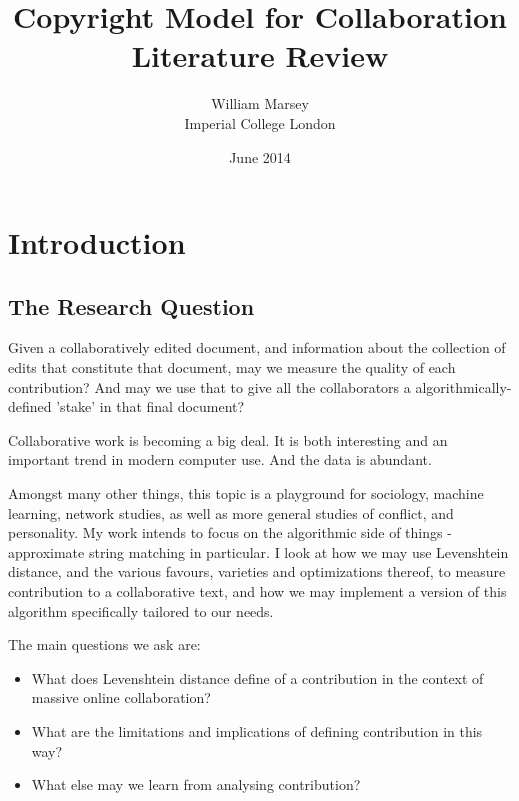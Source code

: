 \documentclass[a4paper,11pt,twoside,notitlepage]{article}
\begin{document}
	\title{Copyright Model for Collaboration
		\\ \small Literature Review}
	\author{William Marsey
		\\Imperial College London}
	\date{June 2014}
 	\maketitle	

        \section{Introduction}
        \subsection{The Research Question}
        Given a collaboratively edited document, and information about
        the collection of edits that constitute that document, may we
        measure the quality of each contribution? And may we use that
        to give all the collaborators a algorithmically-defined 'stake'
        in that final document?
        
        Collaborative work is becoming a big deal. It is both
        interesting and an important trend in modern computer
        use. And the data is abundant. 

        Amongst many other things, this topic is a playground for
        sociology, machine learning, network studies, as well as more
        general studies of conflict, and personality. My work intends
        to focus on the algorithmic side of things - approximate
        string matching in particular. I look at how we may use
        Levenshtein distance, and the various favours,
        varieties and optimizations thereof, to measure contribution
        to a collaborative text, and how we may implement a version of
        this algorithm specifically tailored to our needs.

        The main questions we ask are:
        \begin{itemize}
          \item What does Levenshtein distance define of a
            contribution in the context of massive online
            collaboration?
          \item What are the limitations and implications of defining
            contribution in this way?
          \item What else may we learn from analysing contribution? 
        \end{itemize}
\end{document}
